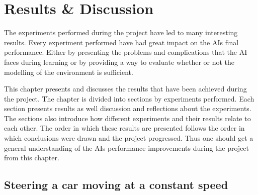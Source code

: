 

\chapter{Results \& Discussion}
The experiments performed during the project have led to many interesting results. Every experiment performed have had great impact on the AIs final performance. Either by presenting the problems and complications that the AI faces during learning or by providing a way to evaluate whether or not the modelling of the environment is sufficient.

This chapter presents and discusses the results that have been achieved during the project. The chapter is divided into sections by experiments performed. Each section presents results as well discussion and reflections about the experiments. The sections also introduce how different experiments and their results relate to each other. The order in which these results are presented follows the order in which conclusions were drawn and the project progressed. Thus one should get a general understanding of the AIs performance improvements during the project from this chapter.


\section{Steering a car moving at a constant speed}


